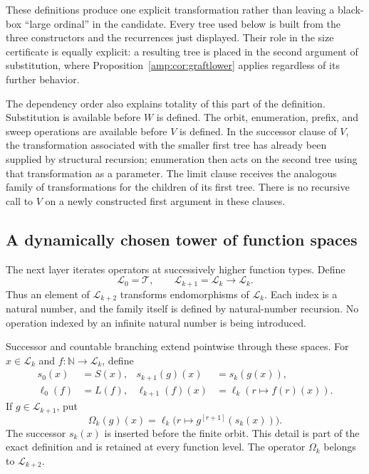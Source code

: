 These definitions produce one explicit transformation rather than leaving
a black-box ``large ordinal'' in the candidate.  Every tree used below is
built from the three constructors and the recurrences just displayed.
Their role in the size certificate is equally explicit: a resulting tree
is placed in the second argument of substitution, where
Proposition~\ref{amp:cor:graftlower} applies regardless of its further behavior.

The dependency order also explains totality of this part of the definition.
Substitution is available before $W$ is defined.  The orbit, enumeration,
prefix, and sweep operations are available before $V$ is defined.  In the
successor clause of $V$, the transformation associated with the smaller
first tree has already been supplied by structural recursion; enumeration
then acts on the second tree using that transformation as a parameter.
The limit clause receives the analogous family of transformations for the
children of its first tree.  There is no recursive call to $V$ on a newly
constructed first argument in these clauses.

\subsection{A dynamically chosen tower of function spaces}
\label{amp:levels}

The next layer iterates operators at successively higher function types.
Define
\[
 \mathcal L_0=\mathcal T,
 \qquad \mathcal L_{k+1}=\mathcal L_k\to\mathcal L_k.
\]
Thus an element of $\mathcal L_{k+2}$ transforms endomorphisms of
$\mathcal L_k$.  Each index is a natural number, and the family itself is
defined by natural-number recursion.  No operation indexed by an infinite
natural number is being introduced.

Successor and countable branching extend pointwise through these spaces.
For $x\in\mathcal L_k$ and $f:\mathbb N\to\mathcal L_k$, define
\begin{align*}
 s_0(x)&=S(x),&
 s_{k+1}(g)(x)&=s_k(g(x)),\\
 \ell_0(f)&=L(f),&
 \ell_{k+1}(f)(x)&=\ell_k(r\mapsto f(r)(x)).
\end{align*}
If $g\in\mathcal L_{k+1}$, put
\[
 \Omega_k(g)(x)=
 \ell_k\bigl(r\mapsto g^{[r+1]}(s_k(x))\bigr).
\]
The successor $s_k(x)$ is inserted before the finite orbit.  This detail is
part of the exact definition and is retained at every function level.
The operator $\Omega_k$ belongs to $\mathcal L_{k+2}$.

